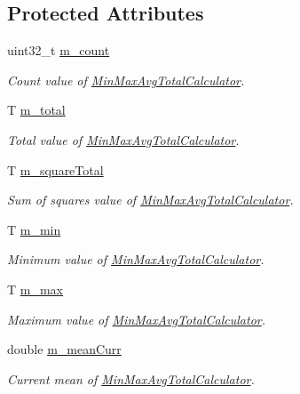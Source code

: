 \subsection*{Protected Attributes}
\begin{DoxyCompactItemize}
\item 
uint32\+\_\+t \hyperlink{classns3_1_1MinMaxAvgTotalCalculator_a6bbdda90ca99cd6188edd12cac6c67f2}{m\+\_\+count}
\begin{DoxyCompactList}\small\item\em Count value of \hyperlink{classns3_1_1MinMaxAvgTotalCalculator}{Min\+Max\+Avg\+Total\+Calculator}. \end{DoxyCompactList}\item 
T \hyperlink{classns3_1_1MinMaxAvgTotalCalculator_ad6b9ad4019cc7156bde6692d6b898c6a}{m\+\_\+total}
\begin{DoxyCompactList}\small\item\em Total value of \hyperlink{classns3_1_1MinMaxAvgTotalCalculator}{Min\+Max\+Avg\+Total\+Calculator}. \end{DoxyCompactList}\item 
T \hyperlink{classns3_1_1MinMaxAvgTotalCalculator_a07c13a50a6e7c3eaa5b9d75f804416aa}{m\+\_\+square\+Total}
\begin{DoxyCompactList}\small\item\em Sum of squares value of \hyperlink{classns3_1_1MinMaxAvgTotalCalculator}{Min\+Max\+Avg\+Total\+Calculator}. \end{DoxyCompactList}\item 
T \hyperlink{classns3_1_1MinMaxAvgTotalCalculator_a2355225c9e982b436171f46702538489}{m\+\_\+min}
\begin{DoxyCompactList}\small\item\em Minimum value of \hyperlink{classns3_1_1MinMaxAvgTotalCalculator}{Min\+Max\+Avg\+Total\+Calculator}. \end{DoxyCompactList}\item 
T \hyperlink{classns3_1_1MinMaxAvgTotalCalculator_a70efcbd101164de6bdc00a33fd1e99ed}{m\+\_\+max}
\begin{DoxyCompactList}\small\item\em Maximum value of \hyperlink{classns3_1_1MinMaxAvgTotalCalculator}{Min\+Max\+Avg\+Total\+Calculator}. \end{DoxyCompactList}\item 
double \hyperlink{classns3_1_1MinMaxAvgTotalCalculator_af44053de695179f32d0ae94fba0d49b4}{m\+\_\+mean\+Curr}
\begin{DoxyCompactList}\small\item\em Current mean of \hyperlink{classns3_1_1MinMaxAvgTotalCalculator}{Min\+Max\+Avg\+Total\+Calculator}. \end{DoxyCompactList}\item 

\end{DoxyCompactItemize}
